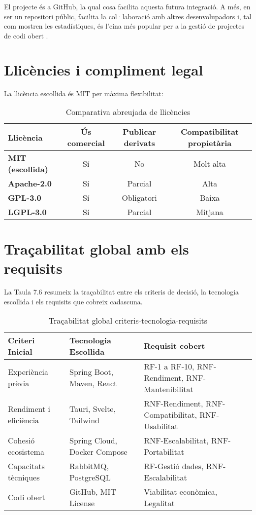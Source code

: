El projecte és a GitHub, la qual cosa facilita aquesta futura integració. A més, en ser un repositori públic, facilita la col·laboració amb altres desenvolupadors i, tal com mostren les estadístiques, és l'eina més popular per a la gestió de projectes de codi obert \cite{kinsta_github_stats}.

\section{Llicències i compliment legal}
La llicència escollida és MIT per màxima flexibilitat:

\begin{table}[h]
\centering
\begin{tabular}{|l|c|c|c|}
\hline
\textbf{Llicència} & \textbf{Ús comercial} & \textbf{Publicar derivats} & \textbf{Compatibilitat propietària} \\
\hline
\textbf{MIT (escollida)} & Sí & No & Molt alta \\
\hline
\textbf{Apache-2.0} & Sí & Parcial & Alta \\
\hline
\textbf{GPL-3.0} & Sí & Obligatori & Baixa \\
\hline
\textbf{LGPL-3.0} & Sí & Parcial & Mitjana \\
\hline
\end{tabular}
\caption{Comparativa abreujada de llicències}
\end{table}

\section{Traçabilitat global amb els requisits}
La Taula 7.6 resumeix la traçabilitat entre els criteris de decisió, la tecnologia escollida i els requisits que cobreix cadascuna.

\begin{sidewaystable}[h]
\centering
\begin{tabular}{|l|l|l|}
\hline
\textbf{Criteri Inicial} & \textbf{Tecnologia Escollida} & \textbf{Requisit cobert} \\
\hline
Experiència prèvia & Spring Boot, Maven, React & RF-1 a RF-10, RNF-Rendiment, RNF-Mantenibilitat \\
Rendiment i eficiència & Tauri, Svelte, Tailwind & RNF-Rendiment, RNF-Compatibilitat, RNF-Usabilitat \\
Cohesió ecosistema & Spring Cloud, Docker Compose & RNF-Escalabilitat, RNF-Portabilitat \\
Capacitats tècniques & RabbitMQ, PostgreSQL & RF-Gestió dades, RNF-Escalabilitat \\
Codi obert & GitHub, MIT License & Viabilitat econòmica, Legalitat \\
\hline
\end{tabular}
\caption{Traçabilitat global criteris-tecnologia-requisits}
\end{sidewaystable}
